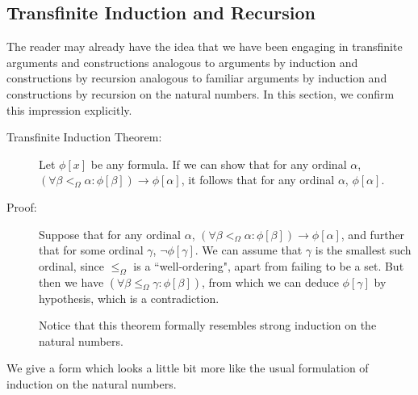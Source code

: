 \documentclass[12pt]{book}
\begin{document}
\newpage

\subsection{Transfinite Induction and Recursion}

The reader may already have the idea that we have been engaging in transfinite arguments and constructions analogous to arguments by induction and constructions by recursion analogous to familiar arguments by induction and constructions by recursion on the natural numbers.  In this section, we confirm this impression explicitly.

\begin{description}

\item[Transfinite Induction Theorem:]  Let $\phi[x]$ be any formula.   If we can show that for any ordinal $\alpha$, $(\forall \beta <_{\Omega} \alpha: \phi[\beta]) \rightarrow \phi[\alpha]$, it follows that for any ordinal $\alpha$, $\phi[\alpha]$.

\item[Proof:]  Suppose that  for any ordinal $\alpha$, $(\forall \beta <_{\Omega} \alpha: \phi[\beta]) \rightarrow \phi[\alpha]$, and further that for some ordinal $\gamma$, $\neg\phi[\gamma]$.  We can assume that $\gamma$ is the smallest such ordinal, since $\leq_{\Omega}$ is a ``well-ordering", apart from failing to be a set.  But then we have
$(\forall \beta \leq_{\Omega} \gamma: \phi[\beta])$, from which we can deduce $\phi[\gamma]$ by hypothesis, which is a contradiction.

Notice that this theorem formally resembles strong induction on the natural numbers.

\end{description}

We give a form which looks a little bit more like the usual formulation of induction on the natural numbers.
\end{document}
